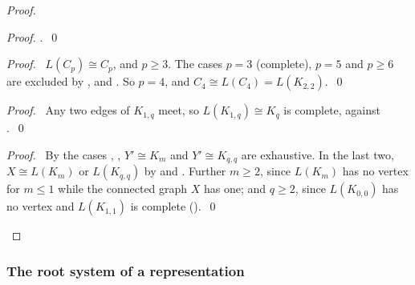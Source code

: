 \begin{proof}
\begin{proof}
  .~\qed\end{proof}
 \begin{proof}\pf\ $L(C_p)\cong C_p$, and $p\ge3$. The cases $p=3$ (complete), $p=5$ and $p\ge6$
  are excluded by ,  and . So $p=4$, and
  $C_4\cong L(C_4)=L(K_{2,2})$.~\qed\end{proof}
 \begin{proof}\pf\ Any two edges of $K_{1,q}$ meet, so $L(K_{1,q})\cong K_q$ is complete, against
  .~\qed\end{proof}
 \qedstep
 \begin{proof}\pf\ By  the cases ,
  , $Y'\cong K_m$ and $Y'\cong K_{q,q}$ are exhaustive. In the last two,
  $X\cong L(K_m)$ or $L(K_{q,q})$ by  and . Further $m\ge2$, since
  $L(K_m)$ has no vertex for $m\le1$ while the connected graph $X$ has one; and $q\ge2$, since
  $L(K_{0,0})$ has no vertex and $L(K_{1,1})$ is complete ().~\qed\end{proof}
\end{proof}

\subsubsection*{The root system of a representation}

